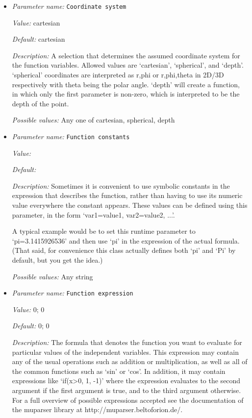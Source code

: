 \begin{itemize}
\item {\it Parameter name:} {\tt Coordinate system}
\label{parameters:Boundary velocity model/Function/Coordinate system}


{\it Value:} cartesian


{\it Default:} cartesian


{\it Description:} A selection that determines the assumed coordinate system for the function variables. Allowed values are `cartesian', `spherical', and `depth'. `spherical' coordinates are interpreted as r,phi or r,phi,theta in 2D/3D respectively with theta being the polar angle. `depth' will create a function, in which only the first parameter is non-zero, which is interpreted to be the depth of the point.


{\it Possible values:} Any one of cartesian, spherical, depth
\item {\it Parameter name:} {\tt Function constants}
\label{parameters:Boundary velocity model/Function/Function constants}


{\it Value:} 


{\it Default:} 


{\it Description:} Sometimes it is convenient to use symbolic constants in the expression that describes the function, rather than having to use its numeric value everywhere the constant appears. These values can be defined using this parameter, in the form `var1=value1, var2=value2, ...'.

A typical example would be to set this runtime parameter to `pi=3.1415926536' and then use `pi' in the expression of the actual formula. (That said, for convenience this class actually defines both `pi' and `Pi' by default, but you get the idea.)


{\it Possible values:} Any string
\item {\it Parameter name:} {\tt Function expression}
\label{parameters:Boundary velocity model/Function/Function expression}


{\it Value:} 0; 0


{\it Default:} 0; 0


{\it Description:} The formula that denotes the function you want to evaluate for particular values of the independent variables. This expression may contain any of the usual operations such as addition or multiplication, as well as all of the common functions such as `sin' or `cos'. In addition, it may contain expressions like `if(x>0, 1, -1)' where the expression evaluates to the second argument if the first argument is true, and to the third argument otherwise. For a full overview of possible expressions accepted see the documentation of the muparser library at http://muparser.beltoforion.de/.


\end{itemize}
